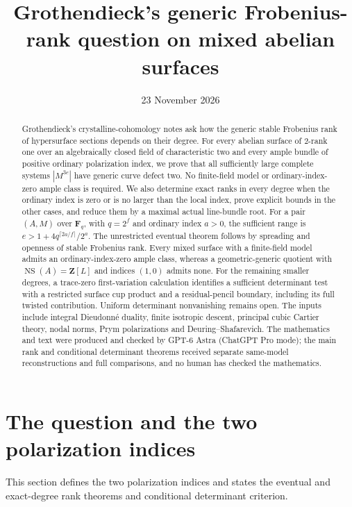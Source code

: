 \documentclass[11pt]{article}
\title{Grothendieck's generic Frobenius-rank question on mixed abelian surfaces}
\author{}
\date{23 November 2026}
\theoremstyle{definition}\newtheorem{definition}[theorem]{Definition}
\theoremstyle{remark}\newtheorem{remark}[theorem]{Remark}
\newcommand{\FF}{\mathbf F}
\newcommand{\NS}{\operatorname{NS}}
\begin{document}
\maketitle
\begin{abstract}
Grothendieck's crystalline-cohomology notes ask how the generic stable Frobenius rank of hypersurface sections depends on their degree. For every abelian surface of $2$-rank one over an algebraically closed field of characteristic two and every ample bundle of positive ordinary polarization index, we prove that all sufficiently large complete systems $|M^{3e}|$ have generic curve defect two. No finite-field model or ordinary-index-zero ample class is required. We also determine exact ranks in every degree when the ordinary index is zero or is no larger than the local index, prove explicit bounds in the other cases, and reduce them by a maximal actual line-bundle root. For a pair $(A,M)$ over $\FF_q$, with $q=2^f$ and ordinary index $a>0$, the sufficient range is $e>1+4q^{\lceil2a/f\rceil}/2^a$. The unrestricted eventual theorem follows by spreading and openness of stable Frobenius rank. Every mixed surface with a finite-field model admits an ordinary-index-zero ample class, whereas a geometric-generic quotient with $\NS(A)=\mathbf Z[L]$ and indices $(1,0)$ admits none. For the remaining smaller degrees, a trace-zero first-variation calculation identifies a sufficient determinant test with a restricted surface cup product and a residual-pencil boundary, including its full twisted contribution. Uniform determinant nonvanishing remains open. The inputs include integral Dieudonn\'e duality, finite isotropic descent, principal cubic Cartier theory, nodal norms, Prym polarizations and Deuring--Shafarevich. The mathematics and text were produced and checked by GPT-6 Astra (ChatGPT Pro mode); the main rank and conditional determinant theorems received separate same-model reconstructions and full comparisons, and no human has checked the mathematics.
\end{abstract}

\section{The question and the two polarization indices}

This section defines the two polarization indices and states the eventual and exact-degree rank theorems and conditional determinant criterion.
\end{document}

